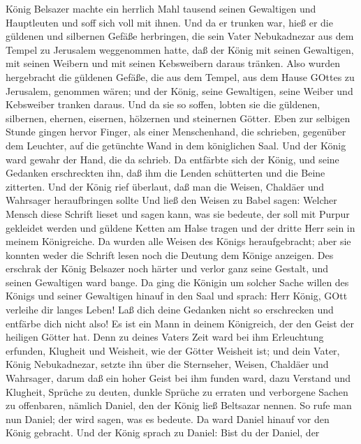  König Belsazer machte ein herrlich Mahl tausend seinen
Gewaltigen und Hauptleuten und soff sich voll mit ihnen. 
Und da er trunken war, hieß er die güldenen und silbernen Gefäße
herbringen, die sein Vater Nebukadnezar aus dem Tempel zu Jerusalem
weggenommen hatte, daß der König mit seinen Gewaltigen, mit seinen
Weibern und mit seinen Kebsweibern daraus tränken.  Also
wurden hergebracht die güldenen Gefäße, die aus dem Tempel, aus dem
Hause GOttes zu Jerusalem, genommen wären; und der König, seine
Gewaltigen, seine Weiber und Kebsweiber tranken daraus.  Und
da sie so soffen, lobten sie die güldenen, silbernen, ehernen, eisernen,
hölzernen und steinernen Götter.  Eben zur selbigen Stunde
gingen hervor Finger, als einer Menschenhand, die schrieben, gegenüber
dem Leuchter, auf die getünchte Wand in dem königlichen Saal. Und der
König ward gewahr der Hand, die da schrieb.  Da entfärbte
sich der König, und seine Gedanken erschreckten ihn, daß ihm die Lenden
schütterten und die Beine zitterten.  Und der König rief
überlaut, daß man die Weisen, Chaldäer und Wahrsager heraufbringen
sollte Und ließ den Weisen zu Babel sagen: Welcher Mensch diese Schrift
lieset und sagen kann, was sie bedeute, der soll mit Purpur gekleidet
werden und güldene Ketten am Halse tragen und der dritte Herr sein in
meinem Königreiche.  Da wurden alle Weisen des Königs
heraufgebracht; aber sie konnten weder die Schrift lesen noch die
Deutung dem Könige anzeigen.  Des erschrak der König
Belsazer noch härter und verlor ganz seine Gestalt, und seinen
Gewaltigen ward bange.  Da ging die Königin um solcher
Sache willen des Königs und seiner Gewaltigen hinauf in den Saal und
sprach: Herr König, GOtt verleihe dir langes Leben! Laß dich deine
Gedanken nicht so erschrecken und entfärbe dich nicht also!
 Es ist ein Mann in deinem Königreich, der den Geist der
heiligen Götter hat. Denn zu deines Vaters Zeit ward bei ihm Erleuchtung
erfunden, Klugheit und Weisheit, wie der Götter Weisheit ist; und dein
Vater, König Nebukadnezar, setzte ihn über die Sternseher, Weisen,
Chaldäer und Wahrsager,  darum daß ein hoher Geist bei ihm
funden ward, dazu Verstand und Klugheit, Sprüche zu deuten, dunkle
Sprüche zu erraten und verborgene Sachen zu offenbaren, nämlich Daniel,
den der König ließ Beltsazar nennen. So rufe man nun Daniel; der wird
sagen, was es bedeute.  Da ward Daniel hinauf vor den König
gebracht. Und der König sprach zu Daniel: Bist du der Daniel, der
